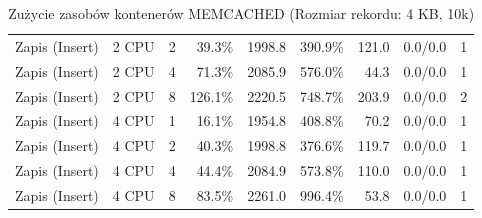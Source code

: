 \begin{table}[ht]
{\begin{tabular}{llcrrrrcc}
Zapis (Insert) & 2 CPU & 2 & 39.3\% & 1998.8 & 390.9\% & 121.0 & 0.0/0.0 & 1 \\
Zapis (Insert) & 2 CPU & 4 & 71.3\% & 2085.9 & 576.0\% & 44.3 & 0.0/0.0 & 1 \\
Zapis (Insert) & 2 CPU & 8 & 126.1\% & 2220.5 & 748.7\% & 203.9 & 0.0/0.0 & 2 \\
Zapis (Insert) & 4 CPU & 1 & 16.1\% & 1954.8 & 408.8\% & 70.2 & 0.0/0.0 & 1 \\
Zapis (Insert) & 4 CPU & 2 & 40.3\% & 1998.8 & 376.6\% & 119.7 & 0.0/0.0 & 1 \\
Zapis (Insert) & 4 CPU & 4 & 44.4\% & 2084.9 & 573.8\% & 110.0 & 0.0/0.0 & 1 \\
Zapis (Insert) & 4 CPU & 8 & 83.5\% & 2261.0 & 996.4\% & 53.8 & 0.0/0.0 & 1 \\
\bottomrule
\end{tabular}%
}
\caption{Zużycie zasobów kontenerów MEMCACHED (Rozmiar rekordu: 4 KB, 10k)}
\label{tab:resources_memcached_medium_10000}
\end{table}

